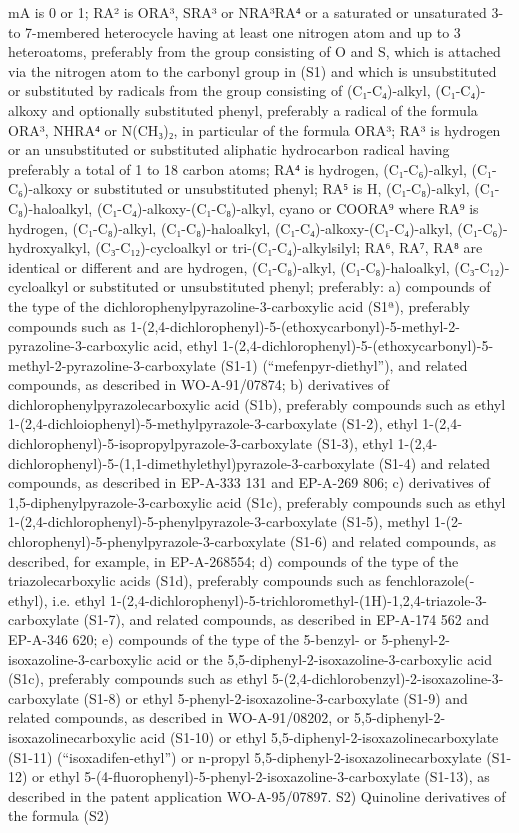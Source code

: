 \documentclass[11pt,a4paper]{article}
\begin{document}
mA is 0 or 1; RA² is ORA³, SRA³ or NRA³RA⁴ or a saturated or unsaturated 3- to 7-membered heterocycle having at least one nitrogen atom and up to 3 heteroatoms, preferably from the group consisting of O and S, which is attached via the nitrogen atom to the carbonyl group in (S1) and which is unsubstituted or substituted by radicals from the group consisting of (C₁-C₄)-alkyl, (C₁-C₄)-alkoxy and optionally substituted phenyl, preferably a radical of the formula ORA³, NHRA⁴ or N(CH₃)₂, in particular of the formula ORA³; RA³ is hydrogen or an unsubstituted or substituted aliphatic hydrocarbon radical having preferably a total of 1 to 18 carbon atoms; RA⁴ is hydrogen, (C₁-C₆)-alkyl, (C₁-C₆)-alkoxy or substituted or unsubstituted phenyl; RA⁵ is H, (C₁-C₈)-alkyl, (C₁-C₈)-haloalkyl, (C₁-C₄)-alkoxy-(C₁-C₈)-alkyl, cyano or COORA⁹ where RA⁹ is hydrogen, (C₁-C₈)-alkyl, (C₁-C₈)-haloalkyl, (C₁-C₄)-alkoxy-(C₁-C₄)-alkyl, (C₁-C₆)-hydroxyalkyl, (C₃-C₁₂)-cycloalkyl or tri-(C₁-C₄)-alkylsilyl; RA⁶, RA⁷, RA⁸ are identical or different and are hydrogen, (C₁-C₈)-alkyl, (C₁-C₈)-haloalkyl, (C₃-C₁₂)-cycloalkyl or substituted or unsubstituted phenyl; preferably: a) compounds of the type of the dichlorophenylpyrazoline-3-carboxylic acid (S1ª), preferably compounds such as 1-(2,4-dichlorophenyl)-5-(ethoxycarbonyl)-5-methyl-2-pyrazoline-3-carboxylic acid, ethyl 1-(2,4-dichlorophenyl)-5-(ethoxycarbonyl)-5-methyl-2-pyrazoline-3-carboxylate (S1-1) (“mefenpyr-diethyl”), and related compounds, as described in WO-A-91/07874; b) derivatives of dichlorophenylpyrazolecarboxylic acid (S1b), preferably compounds such as ethyl 1-(2,4-dichloiophenyl)-5-methylpyrazole-3-carboxylate (S1-2), ethyl 1-(2,4-dichlorophenyl)-5-isopropylpyrazole-3-carboxylate (S1-3), ethyl 1-(2,4-dichlorophenyl)-5-(1,1-dimethylethyl)pyrazole-3-carboxylate (S1-4) and related compounds, as described in EP-A-333 131 and EP-A-269 806; c) derivatives of 1,5-diphenylpyrazole-3-carboxylic acid (S1c), preferably compounds such as ethyl 1-(2,4-dichlorophenyl)-5-phenylpyrazole-3-carboxylate (S1-5), methyl 1-(2-chlorophenyl)-5-phenylpyrazole-3-carboxylate (S1-6) and related compounds, as described, for example, in EP-A-268554; d) compounds of the type of the triazolecarboxylic acids (S1d), preferably compounds such as fenchlorazole(-ethyl), i.e. ethyl 1-(2,4-dichlorophenyl)-5-trichloromethyl-(1H)-1,2,4-triazole-3-carboxylate (S1-7), and related compounds, as described in EP-A-174 562 and EP-A-346 620; e) compounds of the type of the 5-benzyl- or 5-phenyl-2-isoxazoline-3-carboxylic acid or the 5,5-diphenyl-2-isoxazoline-3-carboxylic acid (S1c), preferably compounds such as ethyl 5-(2,4-dichlorobenzyl)-2-isoxazoline-3-carboxylate (S1-8) or ethyl 5-phenyl-2-isoxazoline-3-carboxylate (S1-9) and related compounds, as described in WO-A-91/08202, or 5,5-diphenyl-2-isoxazolinecarboxylic acid (S1-10) or ethyl 5,5-diphenyl-2-isoxazolinecarboxylate (S1-11) (“isoxadifen-ethyl”) or n-propyl 5,5-diphenyl-2-isoxazolinecarboxylate (S1-12) or ethyl 5-(4-fluorophenyl)-5-phenyl-2-isoxazoline-3-carboxylate (S1-13), as described in the patent application WO-A-95/07897. S2) Quinoline derivatives of the formula (S2)
\end{document}
